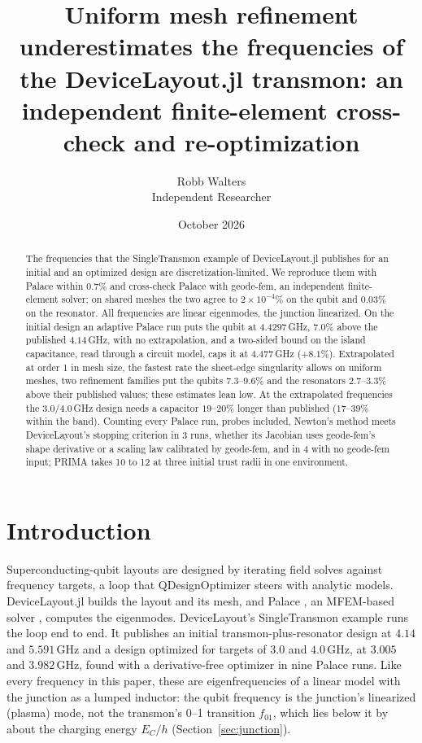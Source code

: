 \documentclass{anvil-paper}
\title{Uniform mesh refinement underestimates the frequencies of the
DeviceLayout.jl transmon: an independent finite-element cross-check and
re-optimization}
\author{Robb Walters\\
  {\normalsize Independent Researcher}}
\date{October 2026}
\begin{document}
\maketitle

\begin{abstract}
The frequencies that the SingleTransmon example of DeviceLayout.jl
publishes for an initial and an optimized design are
discretization-limited. We reproduce them with Palace
within $0.7\%$ and cross-check Palace with geode-fem, an independent
finite-element solver; on shared meshes the two agree to
$2\times10^{-4}\%$ on the qubit and $0.03\%$ on the resonator. All
frequencies are linear eigenmodes, the junction linearized. On the
initial design an adaptive Palace run puts the qubit at $4.4297$\,GHz,
$7.0\%$ above the published $4.14$\,GHz, with no extrapolation, and a
two-sided bound on the island capacitance, read through a circuit model,
caps it at $4.477$\,GHz ($+8.1\%$). Extrapolated at order 1 in mesh
size, the fastest rate the sheet-edge singularity allows on uniform meshes,
two refinement families put the qubits $7.3$--$9.6\%$ and the resonators
$2.7$--$3.3\%$ above their published values; these estimates lean low. At
the extrapolated frequencies the $3.0$/$4.0$\,GHz design needs a capacitor
$19$--$20\%$ longer than published ($17$--$39\%$ within the band). Counting
every Palace run, probes included, Newton's method meets DeviceLayout's stopping criterion in 3
runs, whether its Jacobian uses geode-fem's shape derivative or a scaling
law calibrated by geode-fem, and in 4 with no geode-fem input; PRIMA
takes 10 to 12 at three initial trust radii in one environment.
\end{abstract}

\section{Introduction}
\label{sec:intro}

Superconducting-qubit layouts are designed by iterating field solves
against frequency targets, a loop that QDesignOptimizer
\citep{eriksson2025automated} steers with analytic models. DeviceLayout.jl \citep{devicelayout} builds the layout and
its mesh, and Palace \citep{palace}, an MFEM-based solver \citep{mfem},
computes the eigenmodes. DeviceLayout's SingleTransmon example
\citep{devicelayout-blog,devicelayout-example} runs the loop end to end. It
publishes an initial transmon-plus-resonator design at $4.14$ and
$5.591$\,GHz and a design optimized for targets of $3.0$ and $4.0$\,GHz, at
$3.005$ and $3.982$\,GHz, found with a derivative-free optimizer in nine
Palace runs. Like every frequency in this paper, these are eigenfrequencies
of a linear model with the junction as a lumped inductor: the qubit
frequency is the junction's linearized (plasma) mode, not the transmon's
0--1 transition $f_{01}$, which lies below it by about the charging energy
$E_C/h$ (Section~\ref{sec:junction}).
\end{document}
